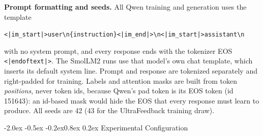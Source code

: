 \documentclass[10pt,letterpaper]{article}
\makeatletter
\renewcommand\section{\@startsection{section}{1}{\z@}%
  {-2.0ex \@plus -0.5ex \@minus -0.2ex}{0.8ex \@plus 0.2ex}%
  {\normalfont\large\bfseries\color{accent}}}
\newcommand{\code}[1]{\texttt{#1}}
\newcommand{\lead}[1]{\textbf{#1}\hspace{0.4em}}
\makeatother
\begin{document}
\lead{Prompt formatting and seeds.} All Qwen training and generation uses the template
\begin{center}\code{<|im\_start|>user\textbackslash n\{instruction\}<|im\_end|>\textbackslash n<|im\_start|>assistant\textbackslash n}\end{center}
with no system prompt, and every response ends with the tokenizer EOS \code{<|endoftext|>}. The SmolLM2 runs use that model's own chat template, which inserts its default system line. Prompt and response are tokenized separately and right-padded for training. Labels and attention masks are built from token \emph{positions}, never token ids, because Qwen's pad token is its EOS token (id 151643): an id-based mask would hide the EOS that every response must learn to produce. All seeds are 42 (43 for the UltraFeedback training draw).

\section{Experimental Configuration}
\end{document}
